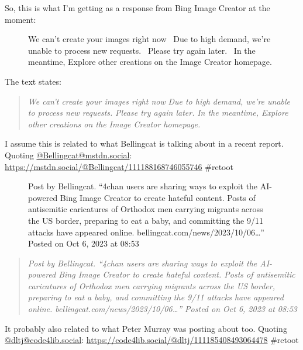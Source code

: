 So, this is what I'm getting as a response from Bing Image Creator at
the moment:

\begin{figure}
\centering
{}
\caption{We can't create your images right now ~Due to high demand,
we're unable to process new requests. ~Please try again later. ~In the
meantime, Explore other creations on the Image Creator homepage.}
\end{figure}

The text states:

\begin{quote}
\emph{We can't create your images right now} \emph{Due to high demand,
we're unable to process new requests.} \emph{Please try again later.}
\emph{In the meantime, Explore other creations on the Image Creator
homepage.}
\end{quote}

I assume this is related to what Bellingcat is talking about in a recent
report. Quoting
\href{https://mstdn.social/@Bellingcat}{@Bellingcat@mstdn.social}:
\url{https://mstdn.social/@Bellingcat/111188168746055746} \#retoot

\begin{figure}
\centering
{}
\caption{Post by Bellingcat. ``4chan users are sharing ways to exploit
the AI-powered Bing Image Creator to create hateful content. Posts of
antisemitic caricatures of Orthodox men carrying migrants across the US
border, preparing to eat a baby, and committing the 9/11 attacks have
appeared online. bellingcat.com/news/2023/10/06\ldots{}'' Posted on Oct
6, 2023 at 08:53}
\end{figure}

\begin{quote}
\emph{Post by Bellingcat. ``4chan users are sharing ways to exploit the
AI-powered Bing Image Creator to create hateful content. Posts of
antisemitic caricatures of Orthodox men carrying migrants across the US
border, preparing to eat a baby, and committing the 9/11 attacks have
appeared online. bellingcat.com/news/2023/10/06\ldots{}'' Posted on Oct
6, 2023 at 08:53}
\end{quote}

It probably also related to what Peter Murray was posting about too.
Quoting \href{https://code4lib.social/@dltj}{@dltj@code4lib.social}:
\url{https://code4lib.social/@dltj/111185408493064478} \#retoot

